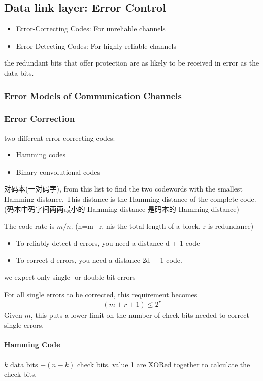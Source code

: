 \subsection{Data link layer: Error Control}
\begin{itemize}
    \item Error-Correcting Codes: For unreliable channels
    \item Error-Detecting Codes: For highly reliable channels
\end{itemize}
the redundant bits that offer protection are as likely to be received in error as the data bits.

\subsubsection{Error Models of Communication Channels}

\subsubsection{Error Correction}
two different error-correcting codes:
\begin{itemize}
    \item Hamming codes
    \item Binary convolutional codes
\end{itemize}

对码本(一对码字), from this list to find the two codewords with the smallest Hamming distance. This distance is the Hamming distance of the complete code. (码本中码字间两两最小的 Hamming distance 是码本的 Hamming distance)

The code rate is $m/n$. (n=m+r, nis the total length of a block, r is redundance)

\begin{itemize}
    \item To reliably detect d errors, you need a distance d + 1 code
    \item To correct d errors, you need a distance 2d + 1 code.
\end{itemize}
we expect only single- or double-bit errors

For all single errors to be corrected, this requirement becomes
\begin{align*}
    (m+r+1)\le 2^r
\end{align*}
Given $m$, this puts a lower limit on the number of check bits needed to correct single errors. 

\paragraph{Hamming Code} $k$ data bits $+ (n - k)$ check bits. value 1 are XORed together to calculate the check bits.  %

